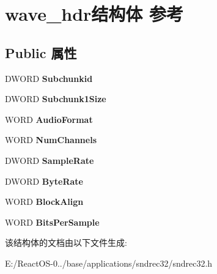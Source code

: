 \hypertarget{structwave__hdr}{}\section{wave\+\_\+hdr结构体 参考}
\label{structwave__hdr}
\subsection*{Public 属性}
\begin{DoxyCompactItemize}
\item 
\mbox{\label{structwave__hdr_a37c59cdec67c30a5220e4d4908141d1b}} 
D\+W\+O\+RD {\bfseries Subchunkid}
\item 
\mbox{\label{structwave__hdr_a60082c68e808284c23fbe577eb31f30e}} 
D\+W\+O\+RD {\bfseries Subchunk1\+Size}
\item 
\mbox{\label{structwave__hdr_af8fc0f479fefddf8b09e995ddd644e8d}} 
W\+O\+RD {\bfseries Audio\+Format}
\item 
\mbox{\label{structwave__hdr_aef28effc13f638d4f4d98a78d8ed9f70}} 
W\+O\+RD {\bfseries Num\+Channels}
\item 
\mbox{\label{structwave__hdr_a056ace1cd248aa0b7db26c1d56394b9d}} 
D\+W\+O\+RD {\bfseries Sample\+Rate}
\item 
\mbox{\label{structwave__hdr_a4429846f889468435d17f55cef098b5b}} 
D\+W\+O\+RD {\bfseries Byte\+Rate}
\item 
\mbox{\label{structwave__hdr_af24a39a1d393499476e6c5ae4d61e357}} 
W\+O\+RD {\bfseries Block\+Align}
\item 
\mbox{\label{structwave__hdr_af22d4df890fcce2ec58a4eab1363102e}} 
W\+O\+RD {\bfseries Bits\+Per\+Sample}
\end{DoxyCompactItemize}


该结构体的文档由以下文件生成\+:\begin{DoxyCompactItemize}
\item 
E\+:/\+React\+O\+S-\/0../base/applications/sndrec32/sndrec32.\+h\end{DoxyCompactItemize}
